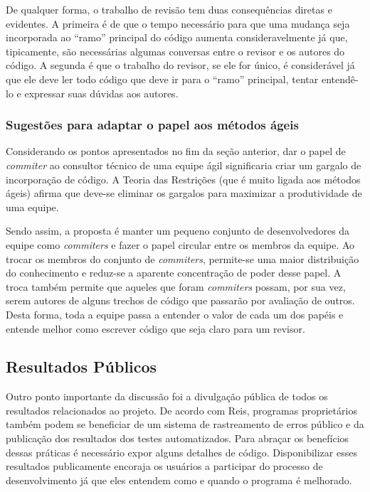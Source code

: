 De qualquer forma, o trabalho de revisão tem duas consequências
diretas e evidentes. A primeira é de que o tempo necessário para que
uma mudança seja incorporada ao ``ramo'' principal do código aumenta
consideravelmente já que, tipicamente, são necessárias algumas
conversas entre o revisor e os autores do código. A segunda é que o
trabalho do revisor, se ele for único, é considerável já que ele deve
ler todo código que deve ir para o ``ramo'' principal, tentar
entendê-lo e expressar suas dúvidas aos autores.

\subsubsection{Sugestões para adaptar o papel aos métodos ágeis}

Considerando os pontos apresentados no fim da seção anterior, dar o
papel de \emph{commiter} ao consultor técnico de uma equipe ágil
significaria criar um gargalo de incorporação de código. A Teoria das
Restrições \cite{goldratt84} (que é muito ligada aos métodos ágeis)
afirma que deve-se eliminar os gargalos para maximizar a produtividade
de uma equipe.

Sendo assim, a proposta é manter um pequeno conjunto de
desenvolvedores da equipe como \emph{commiters} e fazer o papel
circular entre os membros da equipe. Ao trocar os membros do conjunto
de \emph{commiters}, permite-se uma maior distribuição do conhecimento
e reduz-se a aparente concentração de poder desse papel. A troca
também permite que aqueles que foram \emph{commiters} possam, por sua
vez, serem autores de alguns trechos de código que passarão por
avaliação de outros. Desta forma, toda a equipe passa a entender o
valor de cada um dos papéis e entende melhor como escrever código que
seja claro para um revisor.

\subsection{Resultados Públicos}
\label{subsec:publicity}

Outro ponto importante da discussão foi a divulgação pública de todos
os resultados relacionados ao projeto. De acordo com Reis, programas
proprietários também podem se beneficiar de um sistema de rastreamento
de erros público e da publicação dos resultados dos testes
automatizados. Para abraçar os benefícios dessas práticas é necessário
expor alguns detalhes de código. Disponibilizar esses resultados
publicamente encoraja os usuários a participar do processo de
desenvolvimento já que eles entendem como e quando o programa é
melhorado.

